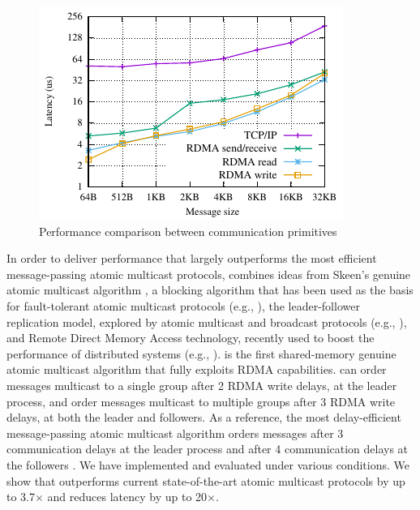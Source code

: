 \begin{figure}[htp!]
    \centering
    \includegraphics[width=0.99\columnwidth]{figures/benchmark/graphs/figure-protocol-bench.pdf}
  \caption{Performance comparison between communication primitives}
  \label{fig:perfcomp}
\end{figure}

In order to deliver performance that largely outperforms the most efficient message-passing atomic multicast protocols, \libname combines ideas from Skeen's genuine atomic multicast algorithm \cite{BJ87b}, a blocking algorithm that has been used as the basis for fault-tolerant atomic multicast protocols (e.g., \cite{Coelho2017,gotsman2019white}), the leader-follower replication model, explored by atomic multicast and broadcast protocols (e.g., \cite{gotsman2019white,Junqueira2011,Mu,delta4}), and Remote Direct Memory Access technology, recently used to boost the performance of distributed systems (e.g., \cite{Aguilera2019,kalia2014using, kalia2016design, mitchell2013using}).
%
\libname is the first shared-memory genuine atomic multicast algorithm that fully exploits RDMA capabilities.
\libname can order messages multicast to a single group after 2 RDMA write delays, at the leader process, and order messages multicast to multiple groups after 3 RDMA write delays, at both the leader and followers. As a reference, the most delay-efficient message-passing atomic multicast algorithm orders messages after 3 communication delays at the leader process and after 4 communication delays at the followers \cite{gotsman2019white}.
We have implemented and evaluated \libname under various conditions. 
We show that \libname outperforms current state-of-the-art atomic multicast protocols by up to 3.7$\times$ and reduces latency by up to 20$\times$.

